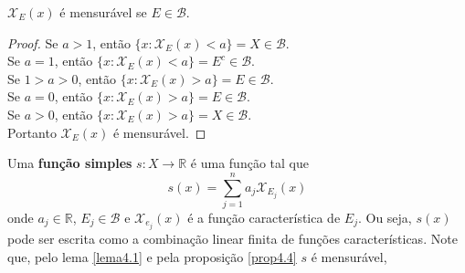 \begin{lema} \label{lema4.1}
    $\mathcal{X}_E(x)$ é mensurável se $E \in \mathcal{B}$.
    \begin{proof}
        Se $a>1$, então $\{x : \mathcal{X}_E(x) < a\} = X \in \mathcal{B}$. \\ 
        Se $a=1$, então $\{x: \mathcal{X}_E(x)<a\}=E^c \in \mathcal{B}$. \\
        Se $1>a>0$, então $\{x: \mathcal{X}_E(x)>a\}=E \in \mathcal{B}$. \\ 
        Se $a=0$, então $\{x: \mathcal{X}_E(x)>a\}=E \in \mathcal{B}$. \\ 
        Se $a>0$, então $\{x: \mathcal{X}_E(x)>a\}=X \in \mathcal{B}$. \\
        Portanto $\mathcal{X}_E(x)$ é mensurável.  
    \end{proof}
\end{lema}

\begin{definicao}
    Uma \textbf{função simples} $s: X \to \mathbb{R}$ é uma função tal que 
    \[
    s(x) = \sum_{j=1} ^n a_j \mathcal{X}_{E_j} (x)    
    \]
    onde $a_j \in \mathbb{R}$, $E_j \in \mathcal{B}$ e $\mathcal{X}_{e_j}(x)$ é a função característica de $E_j$. Ou seja, $s(x)$ pode ser escrita como a combinação linear finita de funções características. Note que, pelo lema \ref{lema4.1} e pela proposição \ref{prop4.4} $s$ é mensurável,
\end{definicao}

